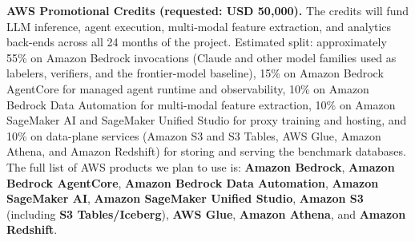 \documentclass[11pt]{article}
\begin{document}
\noindent\textbf{AWS Promotional Credits (requested: USD 50{,}000).} The credits will fund LLM inference, agent execution, multi-modal feature extraction, and analytics back-ends across all 24 months of the project. Estimated split: approximately 55\% on Amazon Bedrock invocations (Claude and other model families used as labelers, verifiers, and the frontier-model baseline), 15\% on Amazon Bedrock AgentCore for managed agent runtime and observability, 10\% on Amazon Bedrock Data Automation for multi-modal feature extraction, 10\% on Amazon SageMaker AI and SageMaker Unified Studio for proxy training and hosting, and 10\% on data-plane services (Amazon S3 and S3 Tables, AWS Glue, Amazon Athena, and Amazon Redshift) for storing and serving the benchmark databases. The full list of AWS products we plan to use is: \textbf{Amazon Bedrock}, \textbf{Amazon Bedrock AgentCore}, \textbf{Amazon Bedrock Data Automation}, \textbf{Amazon SageMaker AI}, \textbf{Amazon SageMaker Unified Studio}, \textbf{Amazon S3} (including \textbf{S3 Tables/Iceberg}), \textbf{AWS Glue}, \textbf{Amazon Athena}, and \textbf{Amazon Redshift}.

\appendix
\renewcommand{\thesection}{\Alph{section}}
\end{document}
